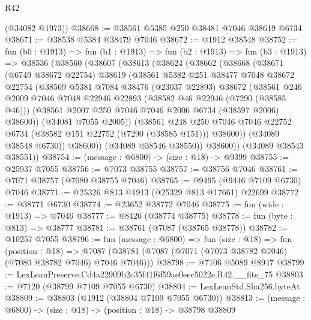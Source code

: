 \begin{lexlean}{R42}
\begin{coremodule}
{      (@34082 @1973))
@38668 := @38561 @5385 @250 @38481 @7046 @38619 @6734
@38671 := @38538 @5384 @38479 @7046
@38672 := @1912 @38548
@38752 := fun (b0 : @1913) =>
  fun (b1 : @1913) =>
  fun (b2 : @1913) =>
  fun (b3 : @1913) =>
  @38536
    (@38560
      (@38607
        (@38613
          (@38624
            (@38662
              (@38668
                (@38671
                  (@6749 @38672 @22754)
                  @38619
                  (@38561
                    @5382
                    @251
                    @38477
                    @7048
                    @38672
                    @22754
                    (@38569
                      @5381
                      @7084
                      @38476
                      (@23037 @22893)
                      @38672
                      (@38561
                        @246
                        @2009
                        @7046
                        @7048
                        @22946
                        @22893
                        (@38582 @46 @22946 (@7290 (@38585 @46)))
                        (@38561 @2007 @250 @7046 @7046 @2006 @6734 (@38597 @2006) @38600))
                      (@34081 @7055 @2005))
                    (@38561
                      @248
                      @250
                      @7046
                      @7046
                      @22752
                      @6734
                      (@38582 @151 @22752 (@7290 (@38585 @151)))
                      @38600))
                  (@34089 @38548 @6730))
                @38600))
            (@34089 @38546 @38550))
          @38600))
      (@34089 @38543 @38551))
@38754 := (message : @6800) -> (size : @18) -> @9399
@38755 := @25937 @7055
@38756 := @7073 @38755
@38757 := @38756 @7046
@38761 := @7071 @38757 (@7080 @38755 @7046)
@38765 := @9495 (@9446 @7109 @6730) @7046
@38771 := @25326 @813 @1913 (@25329 @813 @17661) @22699
@38772 := @38771 @6730
@38774 := @23652 @38772 @7046
@38775 := fun (wide : @1913) => @7046
@38777 := @8426 (@38774 @38775)
@38778 := fun (byte : @813) => @38777
@38781 := @38761 (@7087 (@38765 @38778))
@38782 := @10257 @7055
@38796 := fun (message : @6800) =>
  fun (size : @18) =>
  fun (position : @18) =>
  @7087 (@38781 (@7087 (@7071 (@7073 @38782 @7046) (@7080 @38782 @7046) @7046 @7046)))
@38798 := @7106 @5089 @8947
@38799 := LexLeanPreserve.Cd4a22909b2c35f41f6f59ae0eec5022e.R42.__fits_75
@38803 := @7120 (@38799 @7109 @7055 @6730)
@38804 := LexLeanStd.Sha256.byteAt
@38809 := @38803 (@1912 (@38804 @7109 @7055 @6730))
@38813 := (message : @6800) -> (size : @18) -> (position : @18) -> @38798 @38809
}
\end{coremodule}
\end{lexlean}

